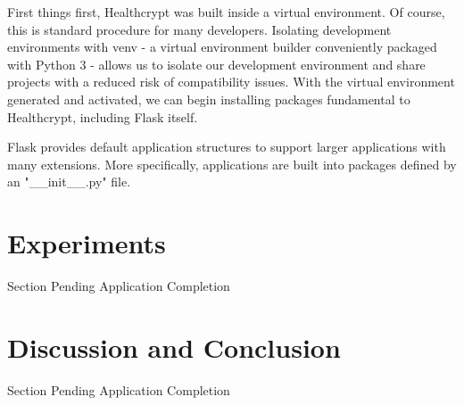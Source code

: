 \documentclass[letterpaper, 10pt,DIV=13]{scrartcl}
\begin{document}
\begin{multicols}{2}
\begin{spacing}{1.25}
First things first, Healthcrypt was built inside a virtual environment. Of course, this is standard procedure for many developers. Isolating development environments with venv - a virtual environment builder conveniently packaged with Python 3 - allows us to isolate our development environment and share projects with a reduced risk of compatibility issues. With the virtual environment generated and activated, we can begin installing packages fundamental to Healthcrypt, including Flask itself.

Flask provides default application structures to support larger applications with many extensions. More specifically, applications are built into packages defined by an "\_\_init\_\_.py" file.

\end{spacing}

\vspace{-2.5pt}

\section*{Experiments}
\begin{spacing}{1.25}

Section Pending Application Completion

\end{spacing}

\vspace{-2.5pt}

\section*{Discussion and Conclusion}
\begin{spacing}{1.25}

Section Pending Application Completion

\end{spacing}

\vspace{-2.5pt}




\end{multicols}
\end{document}
